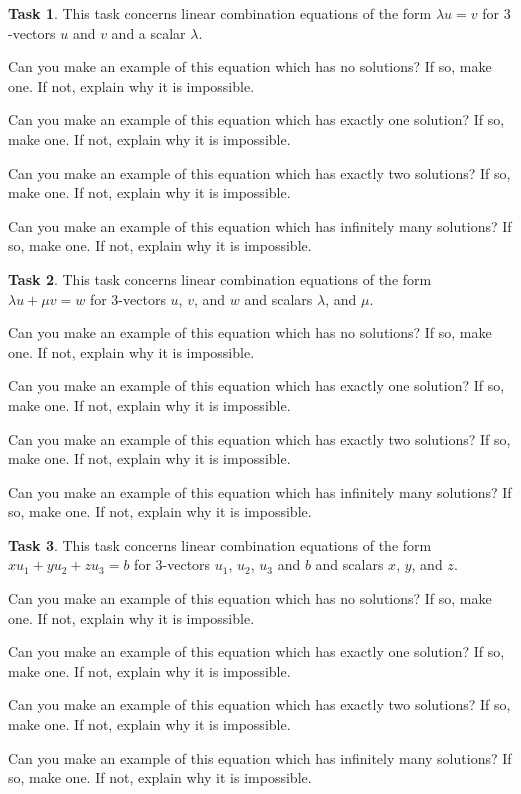 \documentclass{tufte-book}
\theoremstyle{definition}
\newtheorem{task}{Task}
\begin{document}
\begin{task}
This task concerns linear combination equations of the form $\lambda u = v$ for $3$-vectors $u$ and $v$ and a scalar $\lambda$.
\begin{compactitem}
\item Can you make an example of this equation which has no solutions? If so, make one. If not, explain why it is impossible.
\item Can you make an example of this equation which has exactly one solution?  If so, make one. If not, explain why it is impossible.
\item Can you make an example of this equation which has exactly two solutions?  If so, make one. If not, explain why it is impossible.
\item Can you make an example of this equation which has infinitely many solutions? If so, make one. If not, explain why it is impossible.
\end{compactitem}
\end{task}

\begin{task}
This task concerns linear combination equations of the form $\lambda u +\mu v=w$ for $3$-vectors $u$, $v$, and $w$ and scalars $\lambda$, and $\mu$.
\begin{compactitem}
\item Can you make an example of this equation which has no solutions? If so, make one. If not, explain why it is impossible.
\item Can you make an example of this equation which has exactly one solution? If so, make one. If not, explain why it is impossible.
\item Can you make an example of this equation which has exactly two solutions?  If so, make one. If not, explain why it is impossible.
\item Can you make an example of this equation which has infinitely many solutions? If so, make one. If not, explain why it is impossible.
\end{compactitem}
\end{task}

\begin{task}
This task concerns linear combination equations of the form $x u_1 + y u_2 + z u_3 = b$ for $3$-vectors $u_1$, $u_2$, $u_3$ and $b$ and scalars $x$, $y$, and $z$.
\begin{compactitem}
\item Can you make an example of this equation which has no solutions? If so, make one. If not, explain why it is impossible.
\item Can you make an example of this equation which has exactly one solution? If so, make one. If not, explain why it is impossible.
\item Can you make an example of this equation which has exactly two solutions?  If so, make one. If not, explain why it is impossible.
\item Can you make an example of this equation which has infinitely many solutions? If so, make one. If not, explain why it is impossible.
\end{compactitem}
\end{task}
\end{document}
